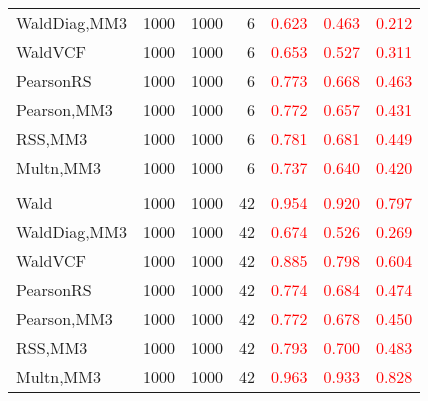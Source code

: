 \documentclass[
]{article}
\begin{document}
\begin{table}[H]
{\begin{tabular}[t]{lrrrrrr}
\hspace{1em}WaldDiag,MM3 & 1000 & 1000 & 6 & \textcolor{red}{0.623} & \textcolor{red}{0.463} & \textcolor{red}{0.212}\\
\hspace{1em}WaldVCF & 1000 & 1000 & 6 & \textcolor{red}{0.653} & \textcolor{red}{0.527} & \textcolor{red}{0.311}\\
\hspace{1em}PearsonRS & 1000 & 1000 & 6 & \textcolor{red}{0.773} & \textcolor{red}{0.668} & \textcolor{red}{0.463}\\
\hspace{1em}Pearson,MM3 & 1000 & 1000 & 6 & \textcolor{red}{0.772} & \textcolor{red}{0.657} & \textcolor{red}{0.431}\\
\hspace{1em}RSS,MM3 & 1000 & 1000 & 6 & \textcolor{red}{0.781} & \textcolor{red}{0.681} & \textcolor{red}{0.449}\\
\hspace{1em}Multn,MM3 & 1000 & 1000 & 6 & \textcolor{red}{0.737} & \textcolor{red}{0.640} & \textcolor{red}{0.420}\\
\addlinespace[0.3em]
\multicolumn{7}{l}{\textbf{3F 15V}}\\
\hspace{1em}Wald & 1000 & 1000 & 42 & \textcolor{red}{0.954} & \textcolor{red}{0.920} & \textcolor{red}{0.797}\\
\hspace{1em}WaldDiag,MM3 & 1000 & 1000 & 42 & \textcolor{red}{0.674} & \textcolor{red}{0.526} & \textcolor{red}{0.269}\\
\hspace{1em}WaldVCF & 1000 & 1000 & 42 & \textcolor{red}{0.885} & \textcolor{red}{0.798} & \textcolor{red}{0.604}\\
\hspace{1em}PearsonRS & 1000 & 1000 & 42 & \textcolor{red}{0.774} & \textcolor{red}{0.684} & \textcolor{red}{0.474}\\
\hspace{1em}Pearson,MM3 & 1000 & 1000 & 42 & \textcolor{red}{0.772} & \textcolor{red}{0.678} & \textcolor{red}{0.450}\\
\hspace{1em}RSS,MM3 & 1000 & 1000 & 42 & \textcolor{red}{0.793} & \textcolor{red}{0.700} & \textcolor{red}{0.483}\\
\hspace{1em}Multn,MM3 & 1000 & 1000 & 42 & \textcolor{red}{0.963} & \textcolor{red}{0.933} & \textcolor{red}{0.828}\\
\bottomrule
\end{tabular}}
\endgroup{}
\end{table}
\end{document}
